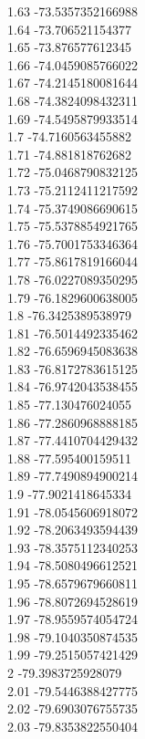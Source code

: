 {1.63	-73.5357352166988\\
1.64	-73.706521154377\\
1.65	-73.876577612345\\
1.66	-74.0459085766022\\
1.67	-74.2145180081644\\
1.68	-74.3824098432311\\
1.69	-74.5495879933514\\
1.7	-74.7160563455882\\
1.71	-74.881818762682\\
1.72	-75.0468790832125\\
1.73	-75.2112411217592\\
1.74	-75.3749086690615\\
1.75	-75.5378854921765\\
1.76	-75.7001753346364\\
1.77	-75.8617819166044\\
1.78	-76.0227089350295\\
1.79	-76.1829600638005\\
1.8	-76.3425389538979\\
1.81	-76.5014492335462\\
1.82	-76.6596945083638\\
1.83	-76.8172783615125\\
1.84	-76.9742043538455\\
1.85	-77.130476024055\\
1.86	-77.2860968888185\\
1.87	-77.4410704429432\\
1.88	-77.595400159511\\
1.89	-77.7490894900214\\
1.9	-77.9021418645334\\
1.91	-78.0545606918072\\
1.92	-78.2063493594439\\
1.93	-78.3575112340253\\
1.94	-78.5080496612521\\
1.95	-78.6579679660811\\
1.96	-78.8072694528619\\
1.97	-78.9559574054724\\
1.98	-79.1040350874535\\
1.99	-79.2515057421429\\
2	-79.3983725928079\\
2.01	-79.5446388427775\\
2.02	-79.6903076755735\\
2.03	-79.8353822550404\\
}
